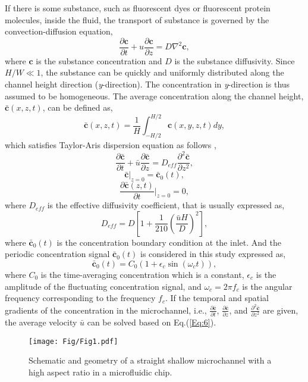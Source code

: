 \documentclass{article}
\begin{document}
If there is some substance, such as fluorescent dyes or fluorescent protein molecules, inside the fluid, the transport of substance is governed by the convection-diffusion equation,
\begin{equation}
	\frac{\partial\mathbf{c}}{\partial t}+u\frac{\partial\mathbf{c}}{\partial z}=D\nabla^2\mathbf{c},
	\label{Eq:4}
\end{equation}
where $\mathbf{c}$ is the substance concentration and $D$ is the substance diffusivity. Since $H/W\ll1$, the substance can be quickly and uniformly distributed along the channel height direction (\emph{y}-direction). The concentration in \emph{y}-direction is thus assumed to be homogeneous. The average concentration along the channel height, $\bar{\mathbf{c}}\left(x,z,t\right)$, can be defined as,
\begin{equation}
	\bar{\mathbf{c}}\left(x,z,t\right)=\frac{1}{H}\int_{-H/2}^{H/2}\mathbf{c}\left(x,y,z,t\right)dy,
\end{equation}
which satisfies Taylor-Aris dispersion equation as follows \citep{li2018transmission},
\begin{equation}
	\frac{\partial\bar{\mathbf{c}}}{\partial t}+\bar{u}	\frac{\partial\bar{\mathbf{c}}}{\partial z}=D_{eff}\frac{\partial^2\bar{\mathbf{c}}}{\partial z^2},
	\label{Eq:6}
\end{equation}
\begin{equation}
	\bar{\mathbf{c}}\vert_{z=0}=\bar{\mathbf{c}}_0\left(t\right),
	\label{Eq:7}
\end{equation}
\begin{equation}
	\frac{\partial\bar{\mathbf{c}}\left(z,t\right)}{\partial t}\vert_{z=0}=0,
	\label{Eq:8}
\end{equation}
where $D_{eff}$ is the effective diffusivity coefficient, that is usually expressed as,
\begin{equation}
	D_{eff}=D\left[1+\frac{1}{210}\left(\frac{\bar{u}H}{D}\right)^2\right],
	\label{Eq:9}
\end{equation}
where $\bar{\mathbf{c}}_0\left(t\right)$ is the concentration boundary condition at the inlet. And the periodic concentration signal $\bar{\mathbf{c}}_0\left(t\right)$ is considered in this study expressed as,
\begin{equation}
	\label{Eq:10}
	\bar{\mathbf{c}}_0\left(t\right)=C_0\left(1+\epsilon_c\sin\left(\omega_ct\right)\right),
\end{equation}
where $C_0$ is the time-averaging concentration which is a constant, $\epsilon_c$ is the amplitude of the fluctuating concentration signal, and $\omega_c=2\pi f_c$ is the angular frequency corresponding to the frequency $f_c$. If the temporal and spatial gradients of the concentration in the microchannel, i.e., $\frac{\partial \bar{\mathbf{c}}}{\partial t}$, $\frac{\partial\bar{\mathbf{c}}}{\partial z}$, and $\frac{\partial^2\bar{\mathbf{c}}}{\partial z^2}$ are given, the average velocity $\bar{u}$ can be solved based on Eq.(\ref{Eq:6}).
\begin{figure}
	\centering
	\texttt{[image: Fig/Fig1.pdf]}
	\caption{Schematic and geometry of a straight shallow microchannel with a high aspect ratio in a microfluidic chip.}
	\label{fig:fig1}
\end{figure}
\end{document}
